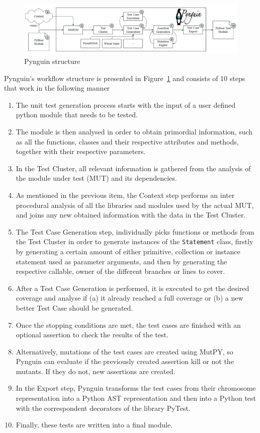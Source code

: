 \documentclass[%
  chapterprefix=false,%
  open=right,%
  twoside=true,%
  paper=a4,%
  logofile={Figures/logo.png},%
  thesistype=master,%
  UKenglish,%
]{se2thesis}
\newcommand{\classname}[1]{\texttt{#1}}
\begin{document}
\begin{figure}[tb]
  \centering
  \includegraphics[width=.99\textwidth]{Figures/pynguin.png}
  \caption{Pynguin structure}\label{fig:pyn}
\end{figure}

Pynguin's workflow structure is presented in Figure~\ref{fig:pyn} and consists of 10 steps that work in the following manner
\begin{enumerate}
  \item The unit test generation process starts with the input of a user defined python module that needs to be tested.
  \item The module is then analysed in order to obtain primordial information, such as all the functions, classes and their respective attributes and methods, together with their respective parameters.
  \item In the Test Cluster, all relevant information is gathered from the analysis of the module under test (MUT) and its dependencies.
  \item As mentioned in the previous item, the Context step performs an inter procedural analysis of all the libraries and modules used by the actual MUT, and joins any new obtained information with the data in the Test Cluster.
  \item The Test Case Generation step, individually picks functions or methods from the Test Cluster in order to generate instances of the \classname{Statement} class, firstly by generating a certain amount of either primitive, collection or instance statement used as parameter arguments, and then by generating the respective callable, owner of the different branches or lines to cover.
  \item After a Test Case Generation is performed, it is executed to get the desired coverage and analyse if (a) it already reached a full coverage or (b) a new better Test Case should be generated.
  \item Once the stopping conditions are met, the test cases are finished with an optional assertion to check the results of the test.
  \item Alternatively, mutations of the test cases are created using MutPY, so Pynguin can evaluate if the previously created assertion kill or not the mutants.
  If they do not, new assertions are created.
  \item In the Export step, Pynguin transforms the test cases from their chromosome representation into a Python AST representation and then into a Python test with the correspondent decorators of the library PyTest.
  \item Finally, these tests are written into a final module.
  
\end{enumerate}
\end{document}
